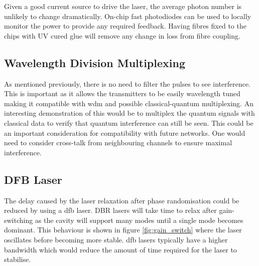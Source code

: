 Given a good current source to drive the laser, the average photon number is unlikely to change dramatically. On-chip fast photodiodes can be used to locally monitor the power to provide any required feedback. Having fibres fixed to the chips with UV cured glue will remove any change in loss from fibre coupling.

%

\subsection{Wavelength Division Multiplexing}

As mentioned previously, there is no need to filter the pulses to see interference. This is important as it allows the transmitters to be easily wavelength tuned making it compatible with \ac{wdm} and possible classical-quantum multiplexing. An interesting demonstration of this would be to multiplex the quantum signals with classical data to verify that quantum interference can still be seen. This could be an important consideration for compatibility with future networks. One would need to consider cross-talk from neighbouring channels to ensure maximal interference.

\subsection{DFB Laser}

The delay caused by the laser relaxation after phase randomisation could be reduced by using a \ac{dfb} laser. \ac{DBR} lasers will take time to relax after gain-switching as the cavity will support many modes until a single mode becomes dominant. This behaviour is shown in figure \ref{fig:gain_switch} where the laser oscillates before becoming more stable. \Ac{dfb} lasers typically have a higher bandwidth which would reduce the amount of time required for the laser to stabilise.

